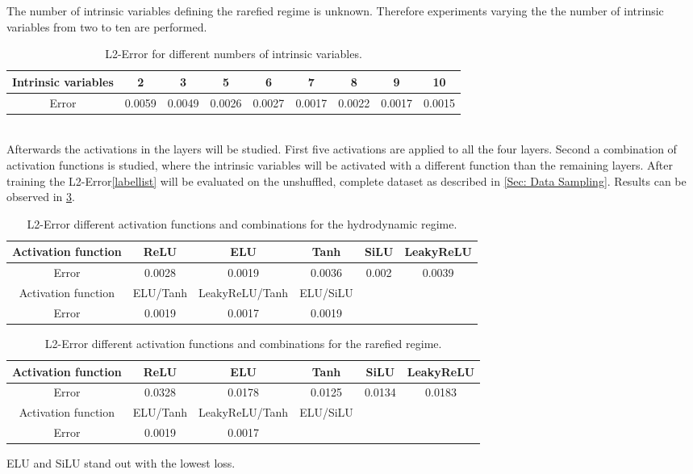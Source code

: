 The number of intrinsic variables defining the rarefied regime is unknown. Therefore experiments varying the the number of intrinsic variables from two to ten are performed. 
\begin{table}[!htbp]\centering
	\begin{tabular}{ |c|c|c|c|c|c|c|c|c| }
		\hline
		Intrinsic variables & 2 & 3 & 5 & 6 & 7 & 8 & 9 & 10 \\ [.5ex]
		\hline
		Error & 0.0059 & 0.0049 & 0.0026 & 0.0027 & 0.0017 & 0.0022 & 0.0017 & 0.0015\\ \hline
	\end{tabular}
	\caption{L2-Error for different numbers of intrinsic variables.}
	\label{Tab:Intrinsic units}
\end{table}\\
Afterwards the activations in the layers will be studied. First five activations are applied to all the four layers. Second a combination of activation functions is studied, where the intrinsic variables will be activated with a different function than the remaining layers. After training the L2-Error\cref{labellist} will be evaluated on the unshuffled, complete dataset as described in \cref{Sec: Data Sampling}. Results can be observed in \cref{Tab:Activations}.
\begin{table}[!htbp]\centering
	\begin{tabular}{ |c|c|c|c|c|c| }
		\hline
		Activation function & ReLU & ELU & Tanh & SiLU & LeakyReLU \\ [.5ex]
		\hline
		Error & 0.0028 & 0.0019 & 0.0036 & 0.002 & 0.0039\\ \hline
		Activation function & ELU/Tanh & LeakyReLU/Tanh & ELU/SiLU & & \\ [.5ex]
		\hline
		Error & 0.0019 & 0.0017 & 0.0019 &  & \\ \hline
	\end{tabular}
	\caption{L2-Error different activation functions and combinations for the hydrodynamic regime.}
	\label{Tab:Activations}
\end{table}
\begin{table}[!htbp]\centering
	\begin{tabular}{ |c|c|c|c|c|c| }
		\hline
		Activation function & ReLU & ELU & Tanh & SiLU & LeakyReLU \\ [.5ex]
		\hline
		Error & 0.0328 & 0.0178 & 0.0125 & 0.0134 & 0.0183\\ \hline
		Activation function & ELU/Tanh & LeakyReLU/Tanh & ELU/SiLU & & \\ [.5ex]
		\hline
		Error & 0.0019 & 0.0017 &  &  & \\ \hline
	\end{tabular}
	\caption{L2-Error different activation functions and combinations for the rarefied regime.}
	\label{Tab:Activations}
\end{table}
ELU and SiLU stand out with the lowest loss.  
